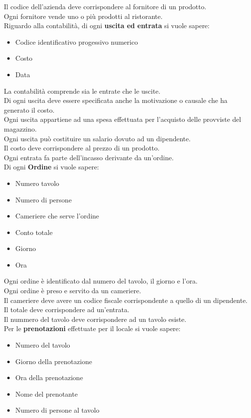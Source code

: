 Il codice dell'azienda deve corrispondere al fornitore di un prodotto. \\
Ogni fornitore vende uno o più prodotti al ristorante. \medskip \\
Riguardo alla contabilità, di ogni \textbf{uscita ed entrata} si vuole sapere:
\begin{itemize}
    \item Codice identificativo progessivo numerico
    \item Costo %
    \item Data
\end{itemize}
La contabilità comprende sia le entrate che le uscite. \\
Di ogni uscita deve essere specificata anche la motivazione o causale che ha generato il costo. \\
Ogni uscita appartiene ad una spesa effettuata per l'acquisto delle provviste del magazzino. \\
Ogni uscita può costituire un salario dovuto ad un dipendente. \\
Il costo deve corrispondere al prezzo di un prodotto. \\
Ogni entrata fa parte dell'incasso derivante da un'ordine. \medskip \\
Di ogni \textbf{Ordine} si vuole sapere:
\begin{itemize}
    \item Numero tavolo 
    \item Numero di persone 
    \item Cameriere che serve l'ordine
    \item Conto totale
    \item Giorno
    \item Ora
\end{itemize}
Ogni ordine è identificato dal numero del tavolo, il giorno e l'ora. \\
Ogni ordine è preso e servito da un cameriere. \\
Il cameriere deve avere un codice fiscale corrispondente a quello di un dipendente. \\
Il totale deve corrispondere ad un'entrata. \\
Il nummero del tavolo deve corrispondere ad un tavolo esiste. \medskip \\
Per le \textbf{prenotazioni} effettuate per il locale si vuole sapere:
\begin{itemize}
    \item Numero del tavolo
    \item Giorno della prenotazione
    \item Ora della prenotazione
    \item Nome del prenotante
    \item Numero di persone al tavolo
\end{itemize}
